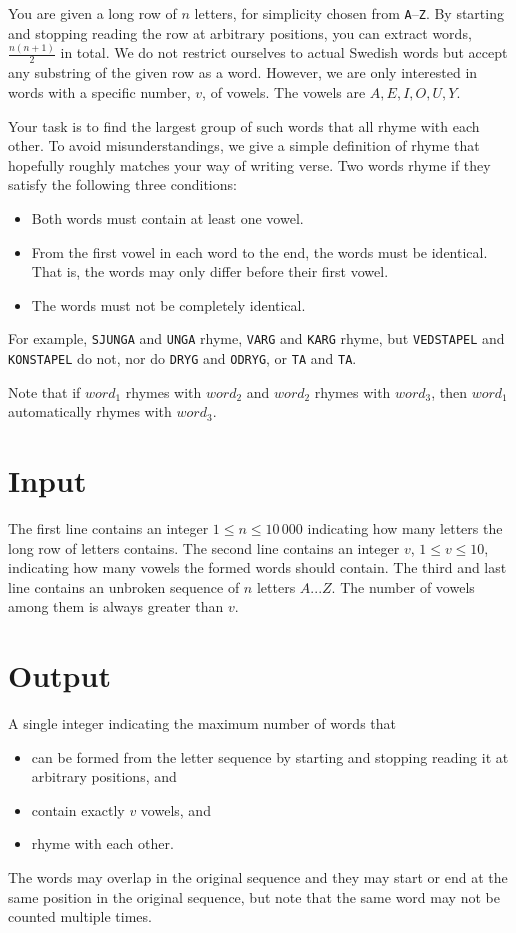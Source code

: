 
You are given a long row of $n$ letters, for simplicity chosen from \texttt{A}--\texttt{Z}. By starting and stopping reading the row at arbitrary positions, you can extract words, $\frac{n(n+1)}{2}$ in total. We do not restrict ourselves to actual Swedish words but accept any substring of the given row as a word. However, we are only interested in words with a specific number, $v$, of vowels. The vowels are $A, E, I, O, U, Y$.

Your task is to find the largest group of such words that all rhyme with each other. To avoid misunderstandings, we give a simple definition of rhyme that hopefully roughly matches your way of writing verse. Two words rhyme if they satisfy the following three conditions:

\begin{itemize}
	\item Both words must contain at least one vowel.
	\item From the first vowel in each word to the end, the words must be identical. That is, the words may only differ before their first vowel.
	\item The words must not be completely identical.
\end{itemize}

For example, \texttt{SJUNGA} and \texttt{UNGA} rhyme, \texttt{VARG} and \texttt{KARG} rhyme, but \texttt{VEDSTAPEL} and \texttt{KONSTAPEL} do not, nor do \texttt{DRYG} and \texttt{ODRYG}, or \texttt{TA} and \texttt{TA}.

Note that if $word_1$ rhymes with $word_2$ and $word_2$ rhymes with $word_3$, then $word_1$ automatically rhymes with $word_3$.

\section*{Input}
The first line contains an integer $1 \le n \le 10\,000$ indicating how many letters the long row of letters contains. The second line contains an integer $v$, $1 \le v \le 10$, indicating how many vowels the formed words should contain. The third and last line contains an unbroken sequence of $n$ letters $A...Z$. The number of vowels among them is always greater than $v$.

\section*{Output}
A single integer indicating the maximum number of words that
\begin{itemize}
	\item can be formed from the letter sequence by starting and stopping reading it at arbitrary positions, and
	\item contain exactly $v$ vowels, and
	\item rhyme with each other.
\end{itemize}
The words may overlap in the original sequence and they may start or end at the same position in the original sequence, but note that the same word may not be counted multiple times.
